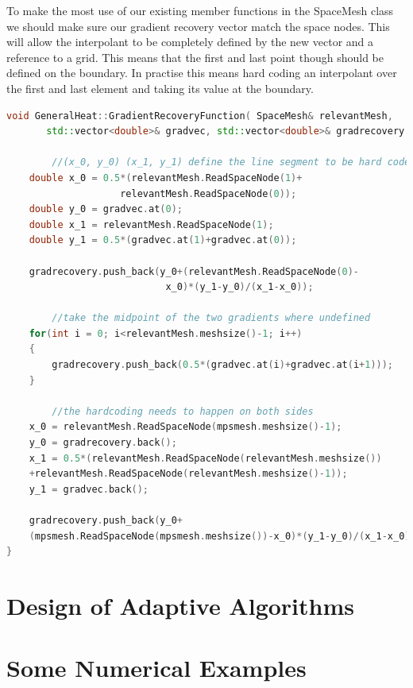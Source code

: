 \documentclass{uonmathreport}
\theoremstyle{definition}
\theoremstyle{problem}
\theoremstyle{theorem}
\begin{document}
{To make the most use of our existing member functions in the SpaceMesh class we should make sure our gradient recovery vector match the space nodes. This will allow the interpolant to be completely defined by the new vector and a reference to a grid. This means that the first and last point though should be defined on the boundary. In practise this means hard coding an interpolant over the first and last element and taking its value at the boundary.

\begin{lstlisting}[language=C++]
void GeneralHeat::GradientRecoveryFunction( SpaceMesh& relevantMesh,
       std::vector<double>& gradvec, std::vector<double>& gradrecovery ) {
    	
    	//(x_0, y_0) (x_1, y_1) define the line segment to be hard coded
    double x_0 = 0.5*(relevantMesh.ReadSpaceNode(1)+
    				relevantMesh.ReadSpaceNode(0));
    double y_0 = gradvec.at(0);
    double x_1 = relevantMesh.ReadSpaceNode(1);
    double y_1 = 0.5*(gradvec.at(1)+gradvec.at(0));

    gradrecovery.push_back(y_0+(relevantMesh.ReadSpaceNode(0)-
    						x_0)*(y_1-y_0)/(x_1-x_0));
		
		//take the midpoint of the two gradients where undefined
    for(int i = 0; i<relevantMesh.meshsize()-1; i++)
    {
        gradrecovery.push_back(0.5*(gradvec.at(i)+gradvec.at(i+1)));
    }
		
		//the hardcoding needs to happen on both sides
    x_0 = relevantMesh.ReadSpaceNode(mpsmesh.meshsize()-1);
    y_0 = gradrecovery.back();
    x_1 = 0.5*(relevantMesh.ReadSpaceNode(relevantMesh.meshsize())			   
    +relevantMesh.ReadSpaceNode(relevantMesh.meshsize()-1));
    y_1 = gradvec.back();

    gradrecovery.push_back(y_0+
    (mpsmesh.ReadSpaceNode(mpsmesh.meshsize())-x_0)*(y_1-y_0)/(x_1-x_0));
}

\end{lstlisting}



\newpage

\section{Design of Adaptive Algorithms} \label{sec:Adaptive}

\newpage

\section{Some Numerical Examples} \label{sec:Examples}

}
\end{document}
